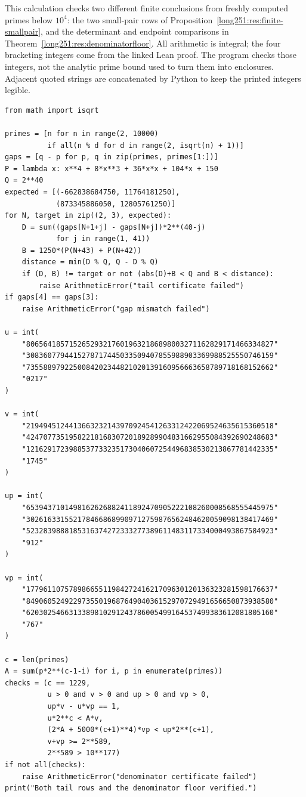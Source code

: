 This calculation checks two different finite conclusions from freshly
computed primes below $10^4$: the two small-pair rows of
Proposition~\ref{long251:res:finite-smallpair}, and the determinant and
endpoint comparisons in Theorem~\ref{long251:res:denominatorfloor}.
All arithmetic is integral; the four bracketing integers come from the
linked Lean proof.  The program checks those integers, not the analytic
prime bound used to turn them into enclosures.  Adjacent quoted strings
are concatenated by Python to keep the printed integers legible.
{\footnotesize
\begin{verbatim}
from math import isqrt

primes = [n for n in range(2, 10000)
          if all(n % d for d in range(2, isqrt(n) + 1))]
gaps = [q - p for p, q in zip(primes, primes[1:])]
P = lambda x: x**4 + 8*x**3 + 36*x*x + 104*x + 150
Q = 2**40
expected = [(-662838684750, 11764181250),
            (873345886050, 12805761250)]
for N, target in zip((2, 3), expected):
    D = sum((gaps[N+1+j] - gaps[N+j])*2**(40-j)
            for j in range(1, 41))
    B = 1250*(P(N+43) + P(N+42))
    distance = min(D % Q, Q - D % Q)
    if (D, B) != target or not (abs(D)+B < Q and B < distance):
        raise ArithmeticError("tail certificate failed")
if gaps[4] == gaps[3]:
    raise ArithmeticError("gap mismatch failed")

u = int(
    "8065641857152652932176019632186898003271162829171466334827"
    "3083607794415278717445033509407855988903369988525550746159"
    "7355889792250084202344821020139160956663658789718168152662"
    "0217"
)

v = int(
    "2194945124413663232143970924541263312422069524635615360518"
    "4247077351958221816830720189289904831662955084392690248683"
    "1216291723988537733235173040607254496838530213867781442335"
    "1745"
)

up = int(
    "6539437101498162626882411892470905222108260008568555445975"
    "3026163315521784668689909712759876562484620059098138417469"
    "5232839888185316374272333277389611483117334000493867584923"
    "912"
)

vp = int(
    "1779611075789866551198427241621709630120136323281598176637"
    "8490605249229735501968764904036152970729491656650873938580"
    "6203025466313389810291243786005499164537499383612081805160"
    "767"
)

c = len(primes)
A = sum(p*2**(c-1-i) for i, p in enumerate(primes))
checks = (c == 1229,
          u > 0 and v > 0 and up > 0 and vp > 0,
          up*v - u*vp == 1,
          u*2**c < A*v,
          (2*A + 5000*(c+1)**4)*vp < up*2**(c+1),
          v+vp >= 2**589,
          2**589 > 10**177)
if not all(checks):
    raise ArithmeticError("denominator certificate failed")
print("Both tail rows and the denominator floor verified.")
\end{verbatim}
}

